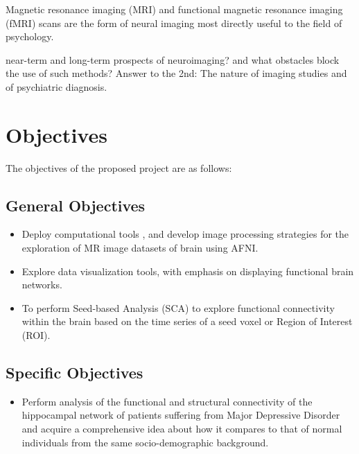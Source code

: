 \documentclass{article}
\begin{document}
Magnetic resonance imaging (MRI) and functional magnetic resonance
imaging (fMRI) scans are the form of neural imaging most directly
useful to the field of psychology.

near-term and long-term prospects of neuroimaging? and what
obstacles block the use of such methods? Answer to the 2nd: The
nature of imaging studies and of psychiatric diagnosis.

\newpage

\section{Objectives}

The objectives of the proposed project are as follows:

\subsection{General Objectives}

\begin{itemize}

  \item Deploy computational tools , and develop image processing
    strategies for the exploration of MR image datasets of brain using
    AFNI.

  \item Explore data visualization tools, with emphasis on displaying
    functional brain networks.

  \item To perform Seed-based Analysis (SCA) to explore functional
    connectivity within the brain based on the time series of a seed
    voxel or Region of Interest (ROI).

\end{itemize}

\subsection{Specific Objectives}

\begin{itemize}

  \item Perform analysis of the functional and structural connectivity
    of the hippocampal network of patients suffering from Major
    Depressive Disorder and acquire a comprehensive idea about how it
    compares to that of normal individuals from the same
    socio-demographic background.



\end{itemize}
\end{document}
